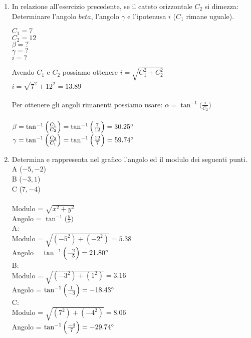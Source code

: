 \documentclass[fleqn]{exam}
\begin{document}
\begin{enumerate}
    \item In relazione all'esercizio precedente, se il cateto orizzontale $C_2$ si dimezza: \\
    Determinare l'angolo $beta$, l'angolo $\gamma$ e l'ipotenusa $i$ ($C_1$ rimane uguale).
    
	$C_1 = 7$ \\
    $C_2 = 12$ \\
    $\beta = ?$ \\
    $\gamma = ?$ \\
    $i = ?$ 


    Avendo $C_1$ e $C_2$ possiamo ottenere $i = \sqrt{C_1^2+C_2^2}$ \\
    $i = \sqrt{7^2+12^2} = 13.89$ \\
    \\ 
    Per ottenere gli angoli rimanenti possiamo usare: $\alpha = \tan^{-1}\Big(\frac{i}{C_2}\Big)$ \\
    \\ 
    $\beta = \tan^{-1}\Big(\frac{C_1}{C_2}\Big) = \tan^{-1}\Big(\frac{7}{12}\Big) = 30.25\degree$\\
    $\gamma = \tan^{-1}\Big(\frac{C_2}{C_1}\Big) = \tan^{-1}\Big(\frac{12}{7}\Big) = 59.74\degree$ 
    
\pagebreak    
    
    \item Determina e rappresenta nel grafico l'angolo ed il modulo dei seguenti punti. \\
    A ($-5, -2$) \\
    B ($-3, 1$) \\
    C ($7, -4$) \\
    \\
    Modulo = $\sqrt{x^2+y^2}$ \\
	Angolo = $\tan^{-1}\Big(\frac{y}{x}\Big)$ \\

    A: \\
    Modulo = $\sqrt{(-5^2)+(-2^2)} = 5.38$ \\
	Angolo = $\tan^{-1}\Big(\frac{-2}{-5}\Big) = 21.80\degree$ \\
    
    B: \\
    Modulo = $\sqrt{(-3^2)+(1^2)} = 3.16$ \\
	Angolo = $\tan^{-1}\Big(\frac{1}{-3}\Big) = -18.43\degree$ \\
    
    C: \\
    Modulo = $\sqrt{(7^2)+(-4^2)} = 8.06$ \\
	Angolo = $\tan^{-1}\Big(\frac{-4}{7}\Big) = -29.74\degree$ \\
    

\end{enumerate}
\end{document}
